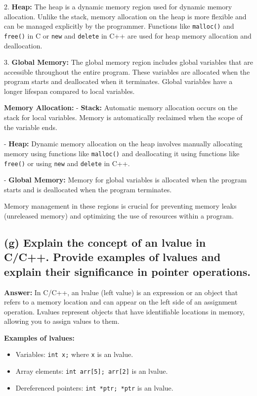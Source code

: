 \documentclass{article}
\begin{document}
\begin{enumerate}
2. \textbf{Heap:} The heap is a dynamic memory region used for dynamic memory allocation. Unlike the stack, memory allocation on the heap is more flexible and can be managed explicitly by the programmer. Functions like \texttt{malloc()} and \texttt{free()} in C or \texttt{new} and \texttt{delete} in C++ are used for heap memory allocation and deallocation.

3. \textbf{Global Memory:} The global memory region includes global variables that are accessible throughout the entire program. These variables are allocated when the program starts and deallocated when it terminates. Global variables have a longer lifespan compared to local variables.

\textbf{Memory Allocation:}
- \textbf{Stack:} Automatic memory allocation occurs on the stack for local variables. Memory is automatically reclaimed when the scope of the variable ends.
  
- \textbf{Heap:} Dynamic memory allocation on the heap involves manually allocating memory using functions like \texttt{malloc()} and deallocating it using functions like \texttt{free()} or using \texttt{new} and \texttt{delete} in C++.

- \textbf{Global Memory:} Memory for global variables is allocated when the program starts and is deallocated when the program terminates.

Memory management in these regions is crucial for preventing memory leaks (unreleased memory) and optimizing the use of resources within a program.
\subsection*{(g) Explain the concept of an lvalue in C/C++. Provide examples of lvalues and explain their significance in pointer operations.}

\textbf{Answer:} In C/C++, an lvalue (left value) is an expression or an object that refers to a memory location and can appear on the left side of an assignment operation. Lvalues represent objects that have identifiable locations in memory, allowing you to assign values to them.

\textbf{Examples of lvalues:}
\begin{itemize}
  \item Variables: \texttt{int x;} where \texttt{x} is an lvalue.
  \item Array elements: \texttt{int arr[5]; arr[2]} is an lvalue.
  \item Dereferenced pointers: \texttt{int *ptr; *ptr} is an lvalue.
\end{itemize}


\end{enumerate}
\end{document}
